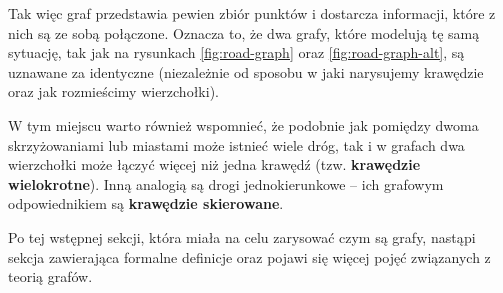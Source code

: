 Tak więc graf przedstawia pewien zbiór punktów i dostarcza informacji, które z nich są ze sobą połączone. Oznacza to, że dwa grafy, które modelują tę samą sytuację, tak jak na rysunkach \ref{fig:road-graph} oraz \ref{fig:road-graph-alt}, są uznawane za identyczne \cite[12]{wilson} (niezależnie od sposobu w jaki narysujemy krawędzie oraz jak rozmieścimy wierzchołki). 

W tym miejscu warto również wspomnieć, że podobnie jak pomiędzy dwoma skrzyżowaniami lub miastami może istnieć wiele dróg, tak i w grafach dwa wierzchołki może łączyć więcej niż jedna krawędź (tzw. \textbf{krawędzie wielokrotne}). Inną analogią są drogi jednokierunkowe -- ich grafowym odpowiednikiem są \textbf{krawędzie skierowane}. 

Po tej wstępnej sekcji, która miała na celu zarysować czym są grafy, nastąpi sekcja zawierająca formalne definicje oraz pojawi się więcej pojęć związanych z teorią grafów. 